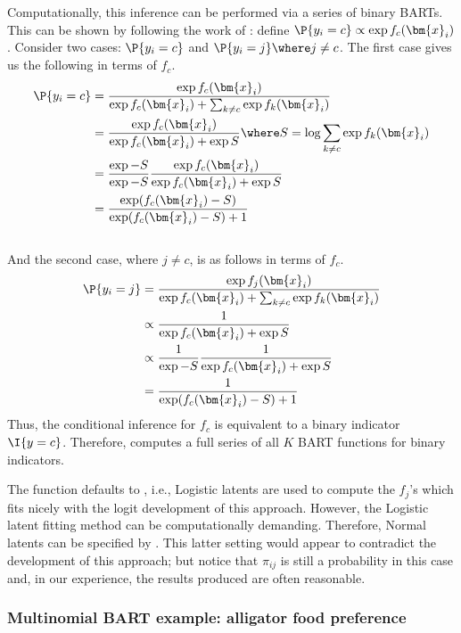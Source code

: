 \documentclass[article]{jss}
\begin{document}
Computationally, this inference can be performed via a series of 
binary BARTs.  This can be shown by following the work of
\citep{HolmHeld06}: define $\P{y_i=c} \propto \exp f_c(\bm{x}_i)$.
Consider two cases: $\P{y_i=c}$ and $\P{y_i=j} \where j\not=c$.
The first case gives us the following in terms of $f_c$.
\begin{align*}
\P{y_i=c} & = \frac{\exp f_c(\bm{x}_i)}{\exp f_c(\bm{x}_i) 
+ \sum_{k\not=c} \exp f_k(\bm{x}_i)} \\
& = \frac{\exp f_c(\bm{x}_i)}{\exp f_c(\bm{x}_i) + \exp S}
\where S=\log \sum_{k\not=c} \exp f_k(\bm{x}_i) \\
& = \frac{ \exp -S}{ \exp -S}\frac{\exp f_c(\bm{x}_i)}
{\exp f_c(\bm{x}_i) + \exp S} \\
& = \frac{\exp (f_c(\bm{x}_i)-S)} {\exp (f_c(\bm{x}_i) -S)  +1}
\end{align*} \\
And the second case, where $j\not=c$, is as follows in terms of $f_c$.\\
\begin{align*}
\P{y_i=j} & = \frac{\exp f_j(\bm{x}_i)}{\exp f_c(\bm{x}_i) 
+ \sum_{k\not=c} \exp f_k(\bm{x}_i)} \\
& \propto \frac{1}{\exp f_c(\bm{x}_i) + \exp S} \\
& \propto \frac{1}{ \exp -S}\frac{1} {\exp f_c(\bm{x}_i) + \exp S} \\
& = \frac{1} {\exp (f_c(\bm{x}_i) -S)  +1}
\end{align*} 
Thus, the conditional inference for $f_c$ is equivalent to a binary indicator
$\I{y=c}$.  Therefore, 
computes a full series of all $K$ BART functions for binary indicators.

The  function defaults to , i.e.,
Logistic latents are used to compute the $f_j$'s which fits nicely
with the logit development of this approach.  However, the Logistic
latent fitting method can be computationally demanding.  Therefore,
Normal latents can be specified by .  This latter
setting would appear to contradict the development of this approach;
but notice that $\pi_{ij}$ is still a probability in this case and,
in our experience, the results produced are often reasonable.

\subsubsection{Multinomial BART example:  alligator food preference}
\end{document}
